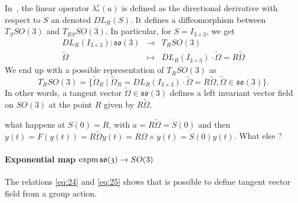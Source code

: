 In~\cite{Bruls.Cardona2010}, the linear operator $\lambda^r_{*}(a)$  is defined as  the directional derivative with respect to $S$ an denoted $DL_R(S)$. It defines a diffeomorphism between $T_SSO(3)$ and $T_{RS}SO(3)$. In particular, for $S=I_{3\times3}$, we get
\begin{equation}
  \label{eq:62}
  \begin{array}{rcl}
    DL_R(I_{3\times3}) : \mathfrak{so}(3) & \rightarrow & T_R SO(3) \\
    \tilde \Omega &\mapsto &DL_R(I_{3\times3})\cdot \tilde \Omega = R \tilde \Omega
  \end{array}
\end{equation}
We end up with a possible representation of $T_{R} SO(3)$ as
\begin{equation}
  \label{eq:63}
  T_{R} SO(3) =\{\tilde \Omega_R \mid \tilde \Omega_R = DL_R(I_{3\times3})\cdot \tilde \Omega = R \tilde \Omega, \tilde \Omega \in\mathfrak{so}(3)  \}.
\end{equation}
In other words, a tangent vector $\tilde \Omega \in \mathfrak{so}(3)$ defines a left invariant vector field on $SO(3)$ at the point $R$ given by $R \tilde \Omega$.




\begin{ndrva}
  what happens at $S(0)=R$, with $ a =R \tilde \Omega =\dot S(0)$ and then $\dot y(t) = F(y(t)) = R \tilde \Omega y(t) =  R\Omega \times y(t)= \dot S(0) y(t) $. What else ? 
\end{ndrva}


\paragraph{Exponential map $\operatorname{expm} \mathfrak{so(3)} \rightarrow SO(3)$}
The relations \eqref{eq:24} and \eqref{eq:25} shows that is possible to define tangent vector field from a group action.

